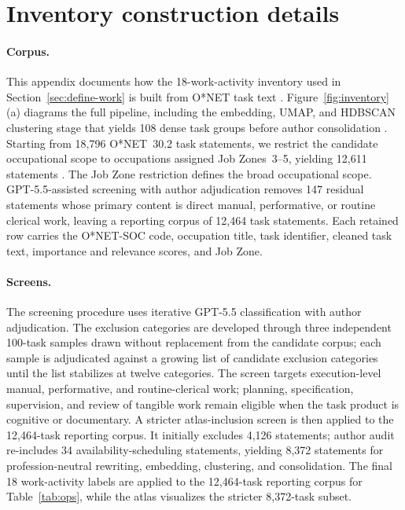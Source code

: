 \documentclass[10pt]{article}
\begin{document}
\newpage
\renewcommand{\bibfont}{\normalsize}



\newpage
\appendix
\renewcommand{\thefigure}{\Alph{section}.\arabic{figure}}
\renewcommand{\thetable}{\Alph{section}.\arabic{table}}
\makeatletter
{}
\makeatother
\setcounter{figure}{0}
\setcounter{table}{0}

\section{Inventory construction details}
\label{app:taxonomy}

\paragraph{Corpus.}
This appendix documents how the 18-work-activity inventory used in Section~\ref{sec:define-work} is built from O{*}NET task text \citep{onet2024tasks}. Figure~\ref{fig:inventory}(a) diagrams the full pipeline, including the embedding, UMAP, and HDBSCAN clustering stage that yields 108 dense task groups before author consolidation \citep{mcinnes2018umap,campello2013density}. Starting from 18{,}796 O{*}NET~30.2 task statements, we restrict the candidate occupational scope to occupations assigned Job Zones~3--5, yielding 12{,}611 statements \citep{onet2024tasks}. The Job Zone restriction defines the broad occupational scope. GPT-5.5-assisted screening with author adjudication removes 147 residual statements whose primary content is direct manual, performative, or routine clerical work, leaving a reporting corpus of 12{,}464 task statements. Each retained row carries the O{*}NET-SOC code, occupation title, task identifier, cleaned task text, importance and relevance scores, and Job Zone.

\paragraph{Screens.}
The screening procedure uses iterative GPT-5.5 classification with author adjudication. The exclusion categories are developed through three independent 100-task samples drawn without replacement from the candidate corpus; each sample is adjudicated against a growing list of candidate exclusion categories until the list stabilizes at twelve categories. The screen targets execution-level manual, performative, and routine-clerical work; planning, specification, supervision, and review of tangible work remain eligible when the task product is cognitive or documentary.
A stricter atlas-inclusion screen is then applied to the 12{,}464-task reporting corpus. It initially excludes 4{,}126 statements; author audit re-includes 34 availability-scheduling statements, yielding 8{,}372 statements for profession-neutral rewriting, embedding, clustering, and consolidation. The final 18 work-activity labels are applied to the 12{,}464-task reporting corpus for Table~\ref{tab:ops}, while the atlas visualizes the stricter 8{,}372-task subset.
\end{document}
